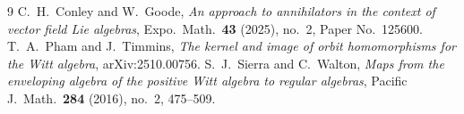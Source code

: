 \documentclass[11pt]{amsart}
\theoremstyle{definition}
\theoremstyle{remark}
\begin{document}
\begin{thebibliography}{9}
 C.~H.~Conley and W.~Goode, \emph{An approach to annihilators in the context of vector field Lie algebras}, Expo.\ Math.\ \textbf{43} (2025), no.~2, Paper No.~125600.
 T.~A.~Pham and J.~Timmins, \emph{The kernel and image of orbit homomorphisms for the Witt algebra}, arXiv:2510.00756.
 S.~J.~Sierra and C.~Walton, \emph{Maps from the enveloping algebra of the positive Witt algebra to regular algebras}, Pacific J.\ Math.\ \textbf{284} (2016), no.~2, 475--509.
\end{thebibliography}
\end{document}
